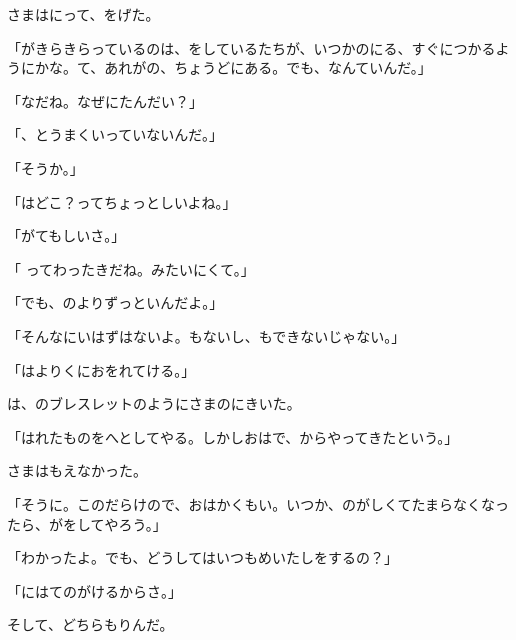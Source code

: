 さまはにって、をげた。

「がきらきらっているのは、をしているたちが、いつかのにる、すぐにつかるようにかな。て、あれがの、ちょうどにある。でも、なんていんだ。」

「なだね。なぜにたんだい？」

「、とうまくいっていないんだ。」

「そうか。」

「はどこ？ってちょっとしいよね。」

「がてもしいさ。」

「 ってわったきだね。みたいにくて。」

「でも、のよりずっといんだよ。」

「そんなにいはずはないよ。もないし、もできないじゃない。」

「はよりくにおをれてける。」

は、のブレスレットのようにさまのにきいた。

「はれたものをへとしてやる。しかしおはで、からやってきたという。」

さまはもえなかった。

「そうに。このだらけので、おはかくもい。いつか、のがしくてたまらなくなったら、がをしてやろう。」

「わかったよ。でも、どうしてはいつもめいたしをするの？」

「にはてのがけるからさ。」

そして、どちらもりんだ。


